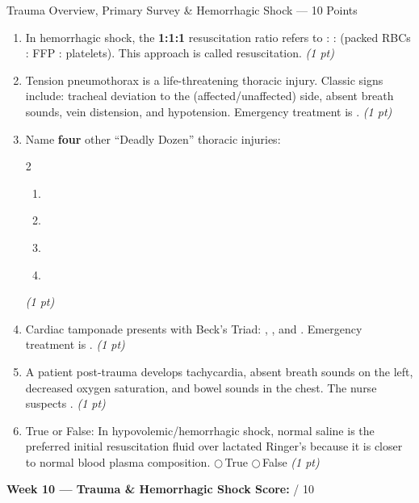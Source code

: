 \documentclass[11pt,letterpaper]{article}
\newcommand{\blank}[1][3cm]{\underline{\hspace{#1}}}
\begin{document}
\begin{diagbox}{Trauma Overview, Primary Survey \& Hemorrhagic Shock --- 10 Points}
\begin{enumerate}[leftmargin=1.5em, label=\textbf{\arabic*.},start=91]
  \item In hemorrhagic shock, the \textbf{1:1:1} resuscitation ratio refers to
        \blank[2.5cm] : \blank[2.5cm] : \blank[2.5cm]
        (packed RBCs : FFP : platelets).  This approach is called
        \blank[4cm] resuscitation.
        \hfill\textit{(1 pt)}

  \item Tension pneumothorax is a life-threatening thoracic injury.  Classic signs include:
        tracheal deviation to the \blank[2cm] (affected/unaffected) side,
        absent breath sounds, \blank[3cm] vein distension, and
        hypotension.  Emergency treatment is \blank[4cm].
        \hfill\textit{(1 pt)}

  \item Name \textbf{four} other ``Deadly Dozen'' thoracic injuries:
        \begin{multicols}{2}
        \begin{enumerate}[label=\arabic*.]
          \item \blank[4cm]
          \item \blank[4cm]
          \item \blank[4cm]
          \item \blank[4cm]
        \end{enumerate}
        \end{multicols}
        \hfill\textit{(1 pt)}

  \item Cardiac tamponade presents with Beck's Triad:
        \blank[3cm], \blank[3cm], and \blank[3cm].
        Emergency treatment is \blank[4cm].
        \hfill\textit{(1 pt)}

  \item A patient post-trauma develops tachycardia, absent breath sounds on the left,
        decreased oxygen saturation, and bowel sounds in the chest.
        The nurse suspects \blank[5cm].
        \hfill\textit{(1 pt)}

  \item True or False: In hypovolemic/hemorrhagic shock, normal saline is the preferred
        initial resuscitation fluid over lactated Ringer's because it is closer to normal
        blood plasma composition.
        \quad$\bigcirc$\,True \quad$\bigcirc$\,False
        \hfill\textit{(1 pt)}

\end{enumerate}

\vspace{0.3cm}
\textbf{Week 10 --- Trauma \& Hemorrhagic Shock Score:} \blank[1cm] / 10
\end{diagbox}
\end{document}
